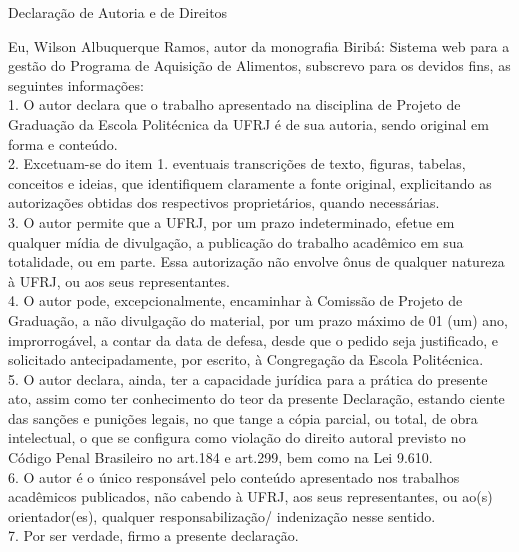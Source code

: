 \begin{center}
Declaração de Autoria e de Direitos
\end{center}

\vspace{0.5cm}

Eu, Wilson Albuquerque Ramos, autor da monografia Biribá: Sistema web para a gestão do Programa de Aquisição de Alimentos, subscrevo para os devidos fins, as seguintes informações:\\
1. O autor declara que o trabalho apresentado na disciplina de Projeto de Graduação da Escola Politécnica da UFRJ é de sua autoria, sendo original em forma e conteúdo.\\
2. Excetuam-se do item 1. eventuais transcrições de texto, figuras, tabelas, conceitos e ideias, que identifiquem claramente a fonte original, explicitando as autorizações obtidas dos respectivos proprietários, quando necessárias.\\
3. O autor permite que a UFRJ, por um prazo indeterminado, efetue em qualquer mídia de divulgação, a publicação do trabalho acadêmico em sua totalidade, ou em parte. Essa autorização não envolve ônus de qualquer natureza à UFRJ, ou aos seus representantes.\\
4. O autor pode, excepcionalmente, encaminhar à Comissão de Projeto de Graduação, a não divulgação do material, por um prazo máximo de 01 (um) ano, improrrogável, a contar da data de defesa, desde que o pedido seja justificado, e solicitado antecipadamente, por escrito, à Congregação da Escola Politécnica.\\
5. O autor declara, ainda, ter a capacidade jurídica para a prática do presente ato, assim como ter conhecimento do teor da presente Declaração, estando ciente das sanções e punições legais, no que tange a cópia parcial, ou total, de obra intelectual, o que se configura como violação do direito autoral previsto no Código Penal Brasileiro no art.184 e art.299, bem como na Lei 9.610.\\
6. O autor é o único responsável pelo conteúdo apresentado nos trabalhos acadêmicos publicados, não cabendo à UFRJ, aos seus representantes,  ou ao(s) orientador(es), qualquer responsabilização/ indenização nesse sentido.\\
7. Por ser verdade, firmo a presente declaração.\\

      \vspace{0.5cm}
      \begin{flushright}
         \parbox{10cm}{
            \hrulefill

            \vspace{-.375cm}

            \vspace{0.1cm}
         }
      \end{flushright}
      
